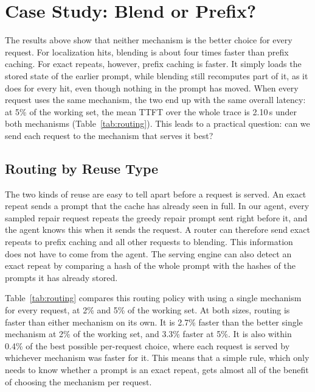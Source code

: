 \section{Case Study: Blend or Prefix?}
\label{sec:recommendation}

The results above show that neither mechanism is the better choice for every request. For localization hits, blending is about four times faster than prefix caching. For exact repeats, however, prefix caching is faster. It simply loads the stored state of the earlier prompt, while blending still recomputes part of it, as it does for every hit, even though nothing in the prompt has moved. When every request uses the same mechanism, the two end up with the same overall latency: at 5\% of the working set, the mean TTFT over the whole trace is 2.10\,s under both mechanisms (Table~\ref{tab:routing}). This leads to a practical question: can we send each request to the mechanism that serves it best?

\subsection{Routing by Reuse Type}
\label{sec:rec_controller}

The two kinds of reuse are easy to tell apart before a request is served. An exact repeat sends a prompt that the cache has already seen in full. In our agent, every sampled repair request repeats the greedy repair prompt sent right before it, and the agent knows this when it sends the request. A router can therefore send exact repeats to prefix caching and all other requests to blending. This information does not have to come from the agent. The serving engine can also detect an exact repeat by comparing a hash of the whole prompt with the hashes of the prompts it has already stored.

Table~\ref{tab:routing} compares this routing policy with using a single mechanism for every request, at 2\% and 5\% of the working set. At both sizes, routing is faster than either mechanism on its own. It is 2.7\% faster than the better single mechanism at 2\% of the working set, and 3.3\% faster at 5\%. It is also within 0.4\% of the best possible per-request choice, where each request is served by whichever mechanism was faster for it. This means that a simple rule, which only needs to know whether a prompt is an exact repeat, gets almost all of the benefit of choosing the mechanism per request.

